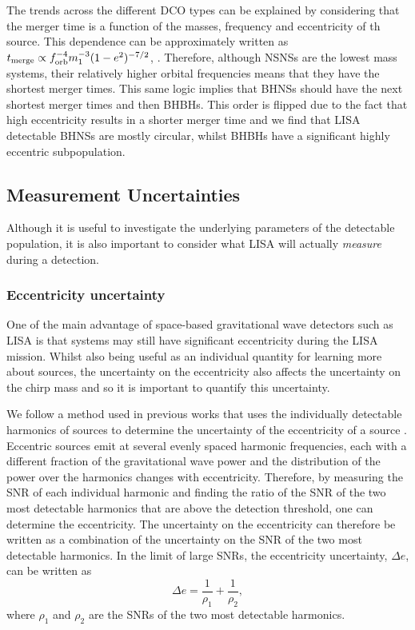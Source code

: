 The trends across the different DCO types can be explained by considering that the merger time is a function of the masses, frequency and eccentricity of th source. This dependence can be approximately written as $t_{\rm merge} \propto f_{\rm orb}^{-4} m_1^{-3} (1 - e^2)^{-7/2}$,  \citep[][Eq.~5.14]{Peters+1964}. Therefore, although NSNSs are the lowest mass systems, their relatively higher orbital frequencies means that they have the shortest merger times. This same logic implies that BHNSs should have the next shortest merger times and then BHBHs. This order is flipped due to the fact that high eccentricity results in a shorter merger time and we find that LISA detectable BHNSs are mostly circular, whilst BHBHs have a significant highly eccentric subpopulation.

\subsection{Measurement Uncertainties}\label{sec:measurement_uncertainties}
Although it is useful to investigate the underlying parameters of the detectable population, it is also important to consider what LISA will actually \textit{measure} during a detection.

\subsubsection{Eccentricity uncertainty}\label{sec:ecc_unc}
One of the main advantage of space-based gravitational wave detectors such as LISA is that systems may still have significant eccentricity during the LISA mission. Whilst also being useful as an individual quantity for learning more about sources, the uncertainty on the eccentricity also affects the uncertainty on the chirp mass and so it is important to quantify this uncertainty.

We follow a method used in previous works that uses the individually detectable harmonics of sources to determine the uncertainty of the eccentricity of a source \citep[e.g.][]{Lau+2020, Korol+2021}. Eccentric sources emit at several evenly spaced harmonic frequencies, each with a different fraction of the gravitational wave power and the distribution of the power over the harmonics changes with eccentricity. Therefore, by measuring the SNR of each individual harmonic and finding the ratio of the SNR of the two most detectable harmonics that are above the detection threshold, one can determine the eccentricity. The uncertainty on the eccentricity can therefore be written as a combination of the uncertainty on the SNR of the two most detectable harmonics. In the limit of large SNRs, the eccentricity uncertainty, $\Delta e$, can be written as 
\begin{equation}
    \Delta e = \frac{1}{\rho_1} + \frac{1}{\rho_2},
\end{equation}
where $\rho_1$ and $\rho_2$ are the SNRs of the two most detectable harmonics.

